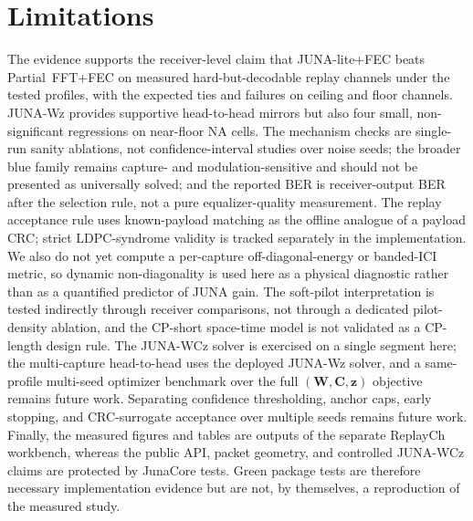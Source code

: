 \documentclass[journal]{IEEEtran}
\newcommand{\juna}{JUNA}
\newcommand{\junalite}{JUNA-lite}
\newcommand{\junawz}{JUNA-Wz}
\newcommand{\junawcz}{JUNA-WCz}
\begin{document}
\clearpage
\section{Limitations}\label{sec:limitations}
The evidence supports the receiver-level claim that \junalite{}+FEC beats
Partial~FFT+FEC on measured hard-but-decodable replay channels under the tested
profiles, with the expected ties and failures on ceiling and floor channels.
\junawz{} provides supportive head-to-head mirrors but also four small,
non-significant regressions on near-floor NA cells. The
mechanism checks are single-run sanity ablations, not confidence-interval studies
over noise seeds; the broader blue family remains capture- and
modulation-sensitive and should not be presented as universally solved; and the
reported BER is receiver-output BER after the selection rule, not a pure
equalizer-quality measurement. The replay acceptance rule uses known-payload
matching as the offline analogue of a payload CRC; strict LDPC-syndrome validity
is tracked separately in the implementation. We also do not yet compute a
per-capture off-diagonal-energy or banded-ICI metric, so dynamic non-diagonality
is used here as a physical diagnostic rather than as a quantified predictor of
\juna{} gain. The soft-pilot interpretation is tested indirectly through receiver
comparisons, not through a dedicated pilot-density ablation, and the CP-short
space-time model is not validated as a CP-length design rule. The \junawcz{}
solver is exercised on a single segment here; the multi-capture head-to-head uses
the deployed \junawz{} solver, and a same-profile multi-seed optimizer benchmark
over the full $(\mathbf W,\mathbf C,\mathbf z)$ objective remains future work. Separating
confidence thresholding, anchor
caps, early stopping, and CRC-surrogate acceptance over multiple seeds remains
future work. Finally, the measured figures and tables are outputs of the
separate ReplayCh workbench, whereas the public API, packet geometry, and
controlled \junawcz{} claims are protected by JunaCore tests. Green package
tests are therefore necessary implementation evidence but are not, by
themselves, a reproduction of the measured study.

\end{document}
